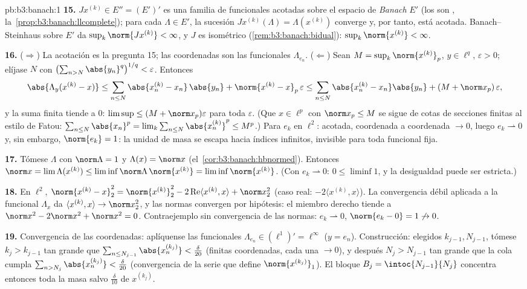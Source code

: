 \begin{solution}{pb:b3:banach:1}
\textbf{15.} $J x^{(k)} \in E'' = (E')'$ es una familia de funcionales
acotadas sobre el espacio de \emph{Banach} $E'$ (los
 son
,
la~\cref{prop:b3:banach:llcomplete}); para cada $\Lambda \in E'$, la
sucesión $Jx^{(k)}(\Lambda) =
\Lambda(x^{(k)})$ converge y, por tanto, está acotada. Banach--Steinhaus
sobre $E'$ da $\sup_k\norm{Jx^{(k)}} <
\infty$, y $J$ es isométrico
(\cref{rem:b3:banach:bidual}): $\sup_k\norm{x^{(k)}} <
\infty$.

\textbf{16.} ($\Rightarrow$) La acotación es la pregunta 15; las
coordenadas son las funcionales $\Lambda_{e_n}$. ($\Leftarrow$) Sean
$M = \sup_k\norm{x^{(k)}}_p$, $y \in
\ell^q$, $\varepsilon > 0$; elíjase $N$ con
$\bigl(\sum_{n>N}\abs{y_n}^q\bigr)^{1/q} < \varepsilon$. Entonces
\[
\abs{\Lambda_y(x^{(k)} - x)} \leq
\sum_{n\leq N}\abs{x^{(k)}_n - x_n}\,\abs{y_n} +
\norm{x^{(k)} - x}_p\,\varepsilon
\leq \sum_{n\leq N}\abs{x^{(k)}_n - x_n}\abs{y_n} +
(M + \norm x_p)\,\varepsilon,
\]
y la suma finita tiende a $0$: $\limsup \leq (M + \norm
x_p)\varepsilon$ para toda $\varepsilon$. (Que $x \in
\ell^p$ con $\norm x_p \leq M$ se sigue de cotas de secciones finitas al
estilo de Fatou: $\sum_{n \leq N}\abs{x_n}^p =
\lim_k\sum_{n\leq N}\abs{x^{(k)}_n}^p \leq M^p$.) Para $e_k$ en
$\ell^2$: acotada, coordenada a coordenada $\to 0$, luego $e_k
\rightharpoonup 0$ y, sin embargo, $\norm{e_k} = 1$: la unidad de masa
se escapa hacia índices infinitos, invisible para toda funcional fija.

\textbf{17.} Tómese $\Lambda$ con $\norm\Lambda = 1$ y
$\Lambda(x) = \norm x$ (el~\cref{cor:b3:banach:hbnormed}). Entonces
$\norm x = \lim\Lambda(x^{(k)}) \leq
\liminf\norm\Lambda\,\norm{x^{(k)}} =
\liminf\norm{x^{(k)}}$. (Con $e_k \rightharpoonup 0$: $0
\leq \liminf 1$, y la desigualdad puede ser estricta.)

\textbf{18.} En $\ell^2$, $\norm{x^{(k)} - x}_2^2 =
\norm{x^{(k)}}_2^2 - 2\operatorname{Re}\langle x^{(k)},
x\rangle + \norm x_2^2$ (caso real: $-2\langle x^{(k)},
x\rangle$). La convergencia débil aplicada a la funcional $\Lambda_x$ da
$\langle x^{(k)}, x\rangle \to \norm
x_2^2$, y las normas convergen por hipótesis: el miembro derecho tiende
a $\norm x^2 - 2\norm x^2 + \norm x^2 = 0$. Contraejemplo sin
convergencia de las normas: $e_k
\rightharpoonup 0$, $\norm{e_k - 0} = 1 \not\to 0$.

\textbf{19.} Convergencia de las coordenadas: aplíquense las funcionales
$\Lambda_{e_n} \in (\ell^1)' = \ell^\infty$ ($y = e_n$).
Construcción: elegidos $k_{j-1}, N_{j-1}$, tómese $k_j >
k_{j-1}$ tan grande que $\sum_{n \leq
N_{j-1}}\abs{x^{(k_j)}_n} < \frac\delta{20}$ (finitas coordenadas, cada
una $\to 0$), y después $N_j > N_{j-1}$ tan grande que la cola cumpla
$\sum_{n > N_j}\abs{x^{(k_j)}_n} <
\frac\delta{20}$ (convergencia de la serie que define
$\norm{x^{(k_j)}}_1$). El bloque $B_j = \intoc{N_{j-1}}{N_j}$ concentra
entonces toda la masa salvo $\frac\delta{10}$ de
$x^{(k_j)}$.


\end{solution}
